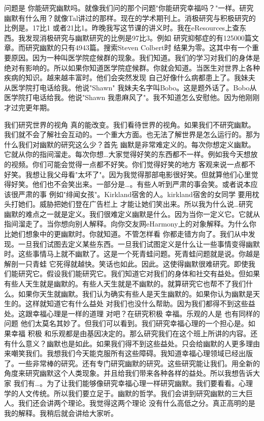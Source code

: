 问题是 你能研究幽默吗。就像我们问的那个问题"你能研究幸福吗？"一样。研究幽默有什么用？就像Tal讲过的那样。现在的学术期刊上。消极研究与积极研究的比例是。17比1 或者21比1。昨晚我写这节课的讲义时。我在eResources上查东西。我发现消极研究与幽默研究的比例是97比3。例如 研究抑郁症的有125000篇文章。而研究幽默的只有4943篇。搜索Steven Colbert时 结果为零。这其中有一个重要原因。因为一种叫医学院症候群的现象。我们知道。我们的学习对我们的身体是绝对有影响的。所以如果你知道医学院症候群。你就会知道。当医生对世界上各种疾病的知识。越来越丰富时。他们会突然发现 自己好像什么病都患上了。我妹夫从医学院打电话给我。他说"Shawn" 我妹夫名字叫Bobo。这是题外话了。Bobo从医学院打电话给我。他说"Shawn 我患麻风了"。我不知道怎么安慰他。因为他刚刚才过完更年期。 

我们研究世界的视角 真的能改变。我们看待世界的视角。如果我们不研究幽默。我们就不会了解社会互动的。一个重大方面。也无法了解世界是怎么运行的。那为什么我们对幽默的研究这么少？首先 幽默是非常难定义的。每次你想定义幽默。它就从你的指间溜走。每次你想…大家觉得好笑的东西都不一样。例如我今天想放的视频。你们可能会觉得一点都不好笑。你们觉得好笑的地方 客观来说一点都不好笑。我想让我父母看"太坏了"。因为我觉得那部电影很好笑。但就算他们心里觉得好笑。他们也不会笑出来。一部分是…。有些人听到严肃的事会笑。或者说本应该很严肃的事 例如"绯闻女孩"。Kirkland宿舍的人。kirkland宿舍的女同学 要用枕头打她们。威胁把她们登在广告栏上 才能让她们笑出来。所以我为什么说…研究幽默的难点之一就是定义。我们很难定义幽默是什么。因为当你一定义它。它就从指间溜走了。当你想向别人解释。向你交友网eHarmony上的对象解释。为什么你比她们想象中的更幽默时。你就知道。不管怎样看 你都走错方向了。我们从中发现。一旦我们试图去定义某些东西。一旦我们试图定义是什么让一些事情变得幽默时。这些事情马上就不幽默了。这是一个死青蛙问题。死青蛙问题就是说。你越是解剖一只青蛙 它死得就越快。笑话也如此。因此。这使得幽默很难研究。即使我们能研究它。假设我们能研究它。我们知道它对我们的身体和社交有益处。但如果有些人天生就是幽默的。有些人天生就是不幽默的。就算研究它也帮不了我们什么。如果你天生就幽默。我们认为确实有些人是天生幽默的。如果你认为幽默是天生的。这样就知道它有什么益处 对我们也没什么帮助。因为我们都得不到这些益处。这跟幸福心理是一样的道理 对吧？在研究积极 幸福。乐观的人是 也有同样的问题 他们太莫名其妙了。但我们可以看到。我们研究幸福心理的一个担心是。如果幸福 积极 和乐观都是由基因决定的。那么研究我们在这个班上所讲的内容。还有什么意义？幽默也是如此。如果我们得不到这些益处。只会给幽默的人更多理由来嘲笑我们。我想我们今天能克服所有这些障碍。我知道幸福心理领域已经出版了。一些非常棒的研究。还有专门研究幽默的研究。这些研究能让我们。用全新的角度来研究幽默这个人类现象。并且给我们带来各种各样的益处。所以我想告诉大家 我们有…。为了让我们能够像研究幸福心理一样研究幽默。我们要看看。心理学的人文传统。所以我们要立足于。幽默的哲学。我们会讲到研究幽默的三大巨人。我们还会讲两个理论。我觉得这两个理论 没有什么高低之分。真正高明的是我的解释。我稍后就会讲给大家听。 

